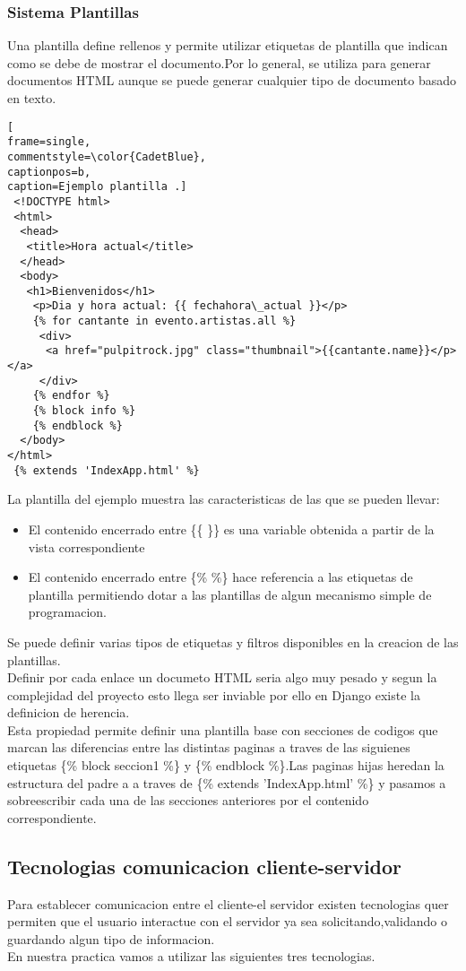 \subsubsection{Sistema Plantillas}
Una plantilla define rellenos y permite utilizar etiquetas de plantilla que indican como se debe de mostrar el documento.Por lo general, se utiliza para generar documentos HTML aunque se puede generar cualquier tipo de documento basado en texto.
\begin{lstlisting}[
frame=single,
commentstyle=\color{CadetBlue},
captionpos=b,
caption=Ejemplo plantilla .]
 <!DOCTYPE html>
 <html>
  <head>
   <title>Hora actual</title>
  </head>
  <body>
   <h1>Bienvenidos</h1>
    <p>Dia y hora actual: {{ fechahora\_actual }}</p>
    {% for cantante in evento.artistas.all %}
     <div>
      <a href="pulpitrock.jpg" class="thumbnail">{{cantante.name}}</p></a>
     </div>
    {% endfor %}
    {% block info %}
    {% endblock %}
  </body>    
</html>
 {% extends 'IndexApp.html' %}
\end{lstlisting}
La plantilla del ejemplo muestra las caracteristicas de las que se pueden llevar:
\begin{itemize}
\item El contenido encerrado entre \{\{ \}\} es una variable obtenida a partir de la vista correspondiente
\item El contenido encerrado entre \{\% \%\} hace referencia a las etiquetas de plantilla permitiendo dotar a las plantillas de algun mecanismo simple de programacion.
\end{itemize}
Se puede definir varias tipos de etiquetas y filtros disponibles en la creacion de las plantillas.
\\Definir por cada enlace un documeto HTML seria algo muy pesado y segun la complejidad del proyecto esto llega ser inviable por ello en Django existe la definicion de herencia.
\\Esta propiedad permite definir una plantilla base con secciones de codigos que marcan las diferencias entre las distintas paginas a traves de las siguienes etiquetas \{\% block seccion1 \%\} y  \{\% endblock \%\}.Las paginas hijas heredan la estructura del padre a a traves de  \{\% extends 'IndexApp.html' \%\} y pasamos a sobreescribir cada una de las secciones anteriores por el contenido correspondiente.
\subsection{Tecnologias comunicacion cliente-servidor}
Para establecer comunicacion entre el cliente-el servidor existen tecnologias quer permiten que el usuario interactue con el servidor ya sea solicitando,validando o guardando algun tipo de informacion. \\En nuestra practica vamos a utilizar las siguientes tres tecnologias.
